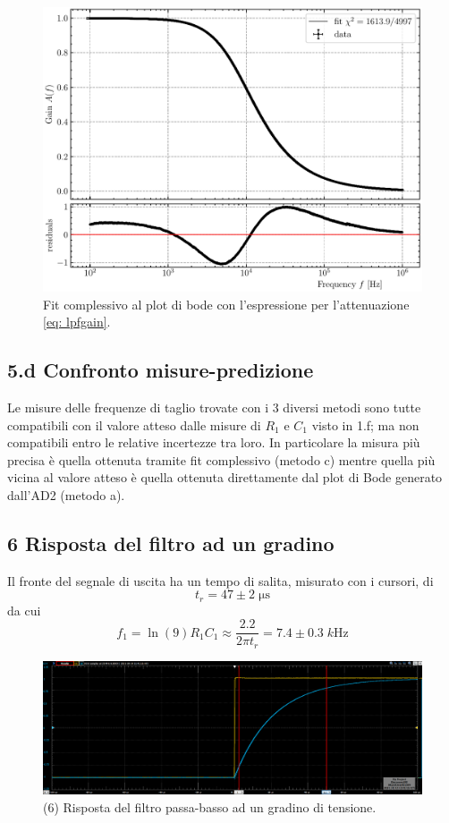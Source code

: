 \documentclass[10pt,a4paper]{article}
\begin{document}
\begin{figure}[htb]
\centering
\includegraphics[scale=0.7]{lpfbodefit}
\caption{Fit complessivo al plot di bode con l'espressione per l'attenuazione
\eqref{eq: lpfgain}.\label{fig: lpfbodefit}}
\end{figure}


\subsection*{5.d Confronto misure-predizione}
Le misure delle frequenze di taglio trovate con i 3 diversi metodi sono tutte
compatibili con il valore atteso dalle misure di $R_1$ e $C_1$ visto in 1.f;
ma non compatibili entro le relative incertezze tra loro.
In particolare la misura più precisa è quella ottenuta tramite fit complessivo
(metodo c) mentre quella più vicina al valore atteso è quella ottenuta
direttamente dal plot di Bode generato dall'AD2 (metodo a).

\subsection*{6 Risposta del filtro ad un gradino}
Il fronte del segnale di uscita ha un tempo di salita, misurato con i cursori, 
di 
\[
t_r = 47 \pm 2 \; \si{\micro\second}
\]
da cui 
\[
f_1 = \ln(9) R_1 C_1 \approx \frac{2.2}{2\pi t_r} = 7.4 \pm 0.3 \; \si{k\Hz}
\]
\begin{figure}[htb]
\centering
\includegraphics[scale=0.35]{rc2k10nF_rise}
\caption{(6) Risposta del filtro passa-basso ad un gradino di tensione.}
\end{figure}
\end{document}
